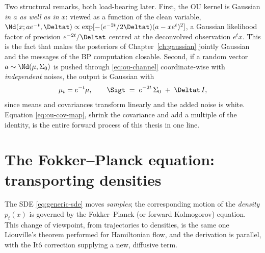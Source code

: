 Two structural remarks, both load-bearing later. First, the OU kernel is
Gaussian \emph{in $a$ as well as in $x$}: viewed as a function of the
clean variable,
$\Nd(x; a e^{-t}, \Deltat) \propto
\exp[-(e^{-2t}/2\Deltat)(a - x e^{t})^2]$, a Gaussian likelihood factor
of precision $e^{-2t}/\Deltat$ centred at the deconvolved observation
$e^t x$. This is the fact that makes the posteriors of
Chapter~\ref{ch:gaussian} jointly Gaussian and the messages of the BP
computation closable. Second, if a random vector
$a \sim \Nd(\mu, \Sigma_0)$ is pushed through \eqref{eq:ou-channel}
coordinate-wise with \emph{independent} noises, the output is Gaussian
with
\begin{equation}
  \mu_t = e^{-t}\mu,
  \qquad
  \Sigt \;=\; e^{-2t}\, \Sigma_0 \;+\; \Deltat\, I ,
  \label{eq:ou-cov-map}
\end{equation}
since means and covariances transform linearly and the added noise is
white. Equation \eqref{eq:ou-cov-map}, shrink the covariance and add a
multiple of the identity, is the entire forward process of this thesis in
one line.

\section{The Fokker--Planck equation: transporting densities}
\label{sec:fokker-planck}

The SDE \eqref{eq:generic-sde} moves \emph{samples}; the corresponding
motion of the \emph{density} $p_t(x)$ is governed by the Fokker--Planck
(or forward Kolmogorov) equation. This change of viewpoint, from
trajectories to densities, is the same one Liouville's theorem performed
for Hamiltonian flow, and the derivation is parallel, with the It\^o
correction supplying a new, diffusive term.

